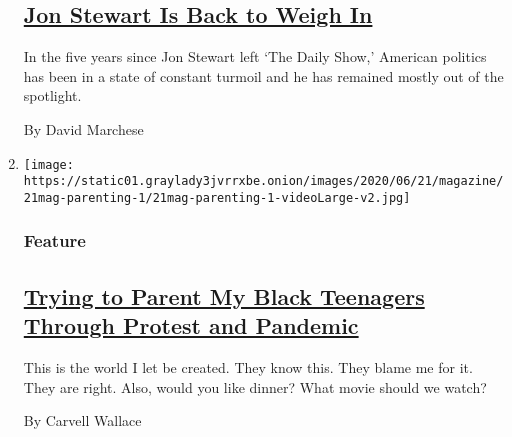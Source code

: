 \begin{enumerate}
  \hypertarget{jon-stewart-is-back-to-weigh-in}{%
  \subsection{\texorpdfstring{\href{/interactive/2020/06/15/magazine/jon-stewart-interview.html}{Jon
  Stewart Is Back to Weigh
  In}}{Jon Stewart Is Back to Weigh In}}\label{jon-stewart-is-back-to-weigh-in}}

  In the five years since Jon Stewart left `The Daily Show,' American
  politics has been in a state of constant turmoil and he has remained
  mostly out of the spotlight.

  By David Marchese
\item
  \texttt{[image: https://static01.graylady3jvrrxbe.onion/images/2020/06/21/magazine/21mag-parenting-1/21mag-parenting-1-videoLarge-v2.jpg]}

  \hypertarget{feature-1}{%
  \subsubsection{Feature}\label{feature-1}}

  \hypertarget{trying-to-parent-my-black-teenagers-through-protest-and-pandemic}{%
  \subsection{\texorpdfstring{\href{/2020/06/15/magazine/parenting-black-teens.html}{Trying
  to Parent My Black Teenagers Through Protest and
  Pandemic}}{Trying to Parent My Black Teenagers Through Protest and Pandemic}}\label{trying-to-parent-my-black-teenagers-through-protest-and-pandemic}}

  This is the world I let be created. They know this. They blame me for
  it. They are right. Also, would you like dinner? What movie should we
  watch?

  By Carvell Wallace
\end{enumerate}

